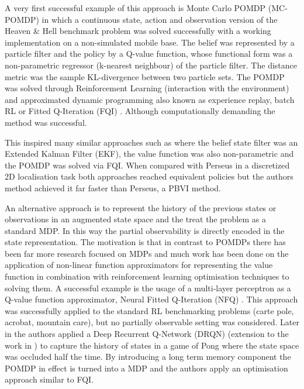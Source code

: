A very first successful example of this approach is Monte Carlo POMDP (MC-POMDP) \cite{MC-POMDP} in which a continuous 
state, action and observation version of the Heaven \& Hell benchmark problem was solved successfully with a working 
implementation on a non-simulated mobile base.  
The belief was represented by a particle filter and the policy by a Q-value function, whose functional form was 
a non-parametric regressor (k-nearest neighbour) of the particle filter. The distance metric was the sample KL-divergence
between two particle sets. The POMDP was solved through Reinforcement Learning (interaction with the environment) and 
approximated dynamic programming also known as experience replay, batch RL or Fitted Q-Iteration (FQI) \cite{Tree_batch_2005}. 
Although computationally demanding the method was successful. 

This inspired many similar approaches such as \cite{mc_update_ppomdps} where the belief state filter was an 
Extended Kalman Filter (EKF), the value function was also non-parametric and the POMDP was solved via FQI. 
When compared with Perseus in a discretized 2D localisation task both approaches reached equivalent 
policies but the authors method achieved it far faster than Perseus, a PBVI method. 

An alternative approach is to represent the history of the previous states or observations in an augmented state space and the treat the problem 
as a standard MDP. In this way the partial observability is directly encoded in the state representation. The motivation is that in contrast to 
POMDPs there has been far more research focused on MDPs and much work has been done on the application of non-linear function 
approximators for representing the value function in combination with reinforcement learning optimisation techniques to solving them.
A successful example is the usage of a multi-layer perceptron as a Q-value function approximator, Neural Fitted Q-Iteration (NFQ) \cite{Riedmiller2005}.
This approach was successfully applied to the standard RL benchmarking problems (carte pole, acrobat, mountain care), but no partially observable
setting was considered. Later in \cite{DRQ_AAAI_2015} the authors applied a Deep Recurrent Q-Network (DRQN) (extension to the work in \cite{mnih-dqn-2015}) to capture the history of states 
in a game of Pong where the state space was occluded half the time. By introducing a long term memory component the POMDP in effect is turned into a MDP and the authors apply an optimisation approach similar to FQI. 

